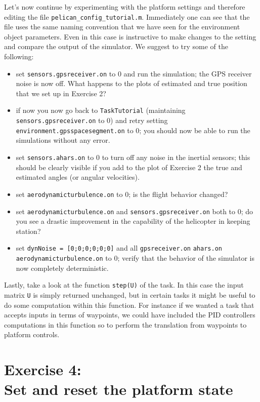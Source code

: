 \documentclass[a4paper,11pt]{article}
\begin{document}
Let's now continue by experimenting with the platform settings and therefore editing the file \texttt{pelican\_config\_tutorial.m}.
Immediately one can see that the file uses the same naming convention that we have seen for the environment object parameters. 
Even in this case is instructive to make changes to the setting and compare the output of the simulator. We suggest to try some of the following:
\begin{itemize}
 \item set \texttt{sensors.gpsreceiver.on} to $0$ and run the simulation; the GPS receiver noise is now off. What happens to the plots of estimated and true position that we set up in Exercise 2?
\item if now you now go back to \texttt{TaskTutorial} (maintaining \texttt{sensors.gpsreceiver.on} to $0$) and retry setting \texttt{environment.gpsspacesegment.on} to $0$; you should now be able to run the simulations without any error.
\item set \texttt{sensors.ahars.on} to $0$ to turn off any noise in the inertial sensors; this should be clearly visible if you add to the plot of Exercise 2 the true and estimated angles (or angular velocities). 
\item set \texttt{aerodynamicturbulence.on} to $0$; is the flight behavior changed?
\item set \texttt{aerodynamicturbulence.on} and \texttt{sensors.gpsreceiver.on} both to $0$; do you see a drastic improvement in the capability of the helicopter in keeping station?
\item set \texttt{dynNoise = [0;0;0;0;0;0]} and all \texttt{gpsreceiver.on} \texttt{ahars.on} \texttt{aerodynamicturbulence.on} to $0$; verify that the behavior of the simulator is now completely deterministic.
\end{itemize}

Lastly, take a look at the function \texttt{step(U)} of the task. In this case the input matrix \texttt{U} is simply returned unchanged, but in certain tasks it might be useful to do some computation within this function. For instance if we wanted a task that accepts inputs in terms of waypoints, we could have included the PID controllers computations in this function so to perform the translation from waypoints to platform controls.

\section*{Exercise 4:\\Set and reset the platform state}
\end{document}
